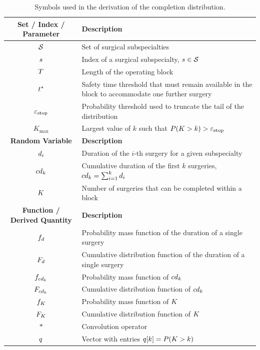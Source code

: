 \begin{table}[htb]
    \centering
    \caption{Symbols used in the derivation of the completion distribution.\label{tab:symb_appnewsvendor}}
    \scriptsize
    \begin{tabular}{cl}
    \toprule
    \textbf{Set / Index / Parameter} & \textbf{Description} \\
    \midrule
    $\mathcal{S}$ & Set of surgical subspecialties \\
    $s$ & Index of a surgical subspecialty, $s \in \mathcal{S}$ \\
    $T$ & Length of the operating block \\
    $t^{*}$ & Safety time threshold that must remain available in the block to accommodate one further surgery \\
    $\varepsilon_{\text{stop}}$ & Probability threshold used to truncate the tail of the distribution \\
    $K_{\max}$ & Largest value of $k$ such that $P(K > k) > \varepsilon_{\text{stop}}$ \\
    \midrule

    \textbf{Random Variable} & \textbf{Description} \\
    \midrule
    $d_i$ & Duration of the $i$-th surgery for a given subspecialty \\
    $cd_{k}$ & Cumulative duration of the first $k$ surgeries, $cd_{k}=\sum_{i=1}^{k}d_i$ \\
    $K$ & Number of surgeries that can be completed within a block \\
    \midrule

    \textbf{Function / Derived Quantity} & \textbf{Description} \\
    \midrule
    $f_{d}$ & Probability mass function of the duration of a single surgery \\
    $F_{d}$ & Cumulative distribution function of the duration of a single surgery \\
    $f_{cd_{k}}$ & Probability mass function of $cd_{k}$ \\
    $F_{cd_{k}}$ & Cumulative distribution function of $cd_{k}$ \\
    $f_{K}$ & Probability mass function of $K$ \\
    $F_{K}$ & Cumulative distribution function of $K$ \\
    $\ast$ & Convolution operator \\
    $q$ & Vector with entries $q[k]=P(K > k)$ \\
    \bottomrule
    \end{tabular}
\end{table}

